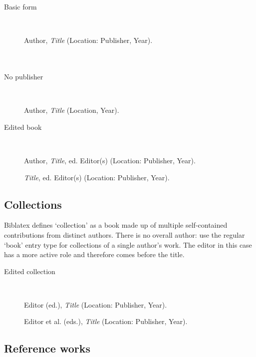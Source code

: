 \documentclass[extrafontsizes,11pt,a4paper,oneside]{memoir}
\newcommand*{\lit}[1]{\textsf{#1}}
\newcommand*{\code}[1]{`\textsf{#1}'}
\begin{document}
    \begin{description}
        \item[Basic form]~\par
        Author, \emph{Title} (Location: Publisher, Year).
        \\
        \\
        \\
        
        \item[No publisher]~\par
        Author, \emph{Title} (Location, Year).
        \\
        
        \item[Edited book]~\par
        Author, \emph{Title}, \lit{ed.} Editor(s) (Location: Publisher, Year). \\\par
        \emph{Title}, \lit{ed.} Editor(s) (Location: Publisher, Year).
        \\
    \end{description}
    
    \subsection{Collections}
    
    Biblatex defines \code{collection} as a book made up of multiple self-contained contributions from distinct authors. There is no overall author: use the regular \code{book} entry type for collections of a single author’s work. The editor in this case has a more active role and therefore comes before the title.
    
    \begin{description}
        \item[Edited collection]~\par
        Editor (\lit{ed.}), \emph{Title} (Location: Publisher, Year).\par
        Editor \lit{et al.} (\lit{eds.}), \emph{Title} (Location: Publisher, Year).
        \\
    \end{description}
    
    \subsection{Reference works}
    
\end{document}
